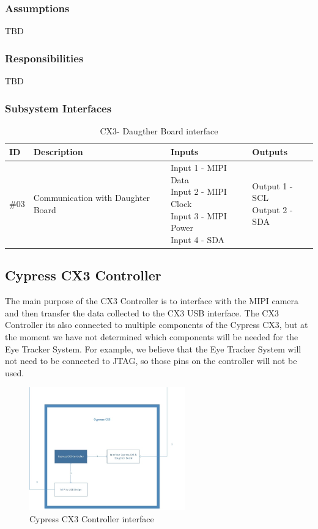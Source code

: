 \subsubsection{Assumptions}
TBD

\subsubsection{Responsibilities}
TBD

\subsubsection{Subsystem Interfaces}

\begin {table}[H]
\caption {CX3- Daugther Board interface}
\begin{center}
    \begin{tabular}{ | p{1cm} | p{6cm} | p{3cm} | p{3cm} |}
    \hline
    ID & Description & Inputs & Outputs \\ \hline
    \#03 & Communication with Daughter Board & \pbox{3cm}{Input 1 - MIPI Data \\ Input 2 - MIPI Clock \\ Input 3 - MIPI Power \\ Input 4 - SDA} & \pbox{3cm}{Output 1 - SCL \\ Output 2 - SDA}  \\ \hline
    \end{tabular}
\end{center}
\end{table}

\subsection{Cypress CX3 Controller}
The main purpose of the CX3 Controller is to interface with the MIPI camera and then transfer the data collected to the CX3 USB interface. The CX3 Controller its also connected to multiple components of the Cypress CX3, but at the moment we have not determined which components will be needed for the Eye Tracker System. For example, we believe that the Eye Tracker System will not need to be connected to JTAG, so those pins on the controller will not be used.

\begin{figure}[h!]
	\centering
 	\includegraphics[width=0.60\textwidth]{images/Cypress_Controller}
 \caption{Cypress CX3 Controller interface}
\end{figure}

